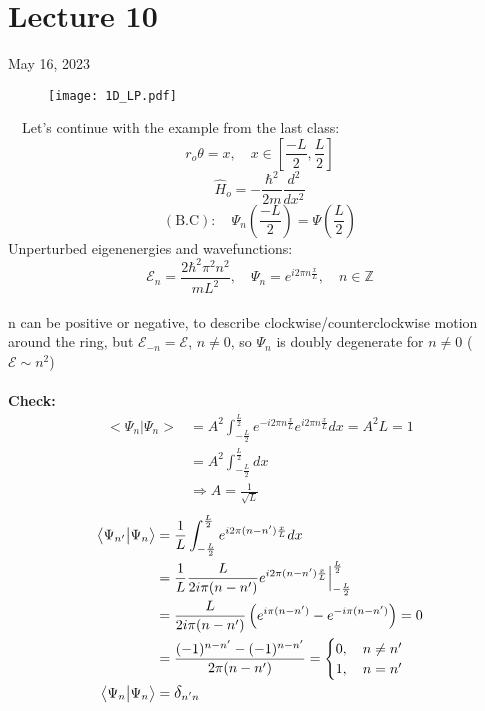 \documentclass[12pt,fancychapters]{report}
\numberwithin{equation}{section}
\begin{document}
\section{Lecture 10}
May 16, 2023\\
\begin{wrapfigure}{l}{6cm}
  \begin{center}
    \texttt{[image: 1D\_LP.pdf]}
  \end{center}
\end{wrapfigure}
\
\
Let's continue with the example from the last class: 
\[r_o \theta = x, \quad x \in \left[\frac{-L}{2}, \frac{L}{2} \right]\]
\[\hat{H}_o = -\frac{\hbar^2}{2m}\frac{d^2}{dx^2}\]
\[\left(\text{B.C}\right):\quad \Psi_n\left(\frac{-L}{2}\right) =
  \Psi\left(\frac{L}{2}\right)
\]
Unperturbed eigenenergies and wavefunctions:
\[
  \mathcal{E}_n = \frac{2\hbar^2 \pi^2 n^2}{mL^2},\quad \Psi_n = e^{i 2\pi n \frac{x}{L}},
  \quad n \in \mathbb{Z}
\]\\
n can be positive or negative, to describe clockwise/counterclockwise motion around the ring, but 
$\mathcal{E}_{-n} = \mathcal{E}$, $n \neq 0$, so $\Psi_n$ is doubly degenerate for 
$n\neq 0$ ($\mathcal{E}\sim n^2$)\\
\\
\textbf{Check:}
\begin{align*}
  \big<\Psi_n\big|\Psi_n\big> &= A^2 \int_{-\frac{L}{2}}^{\frac{L}{2}} e^{-i2\pi n \frac{x}{L}}
  e^{i2\pi n \frac{x}{L}}dx = A^2 L = 1\\
 &= A^2\int_{-\frac{L}{2}}^{\frac{L}{2}} dx \\
 &\Rightarrow \boxed{A = \frac{1}{\sqrt{L}}}
\end{align*}
\begin{align*}
  \big<\Psi_{n'}\big|\Psi_n\big> &= \frac{1}{L}
   \int_{-\frac{L}{2}}^{\frac{L}{2}} e^{i2\pi(n-n') \frac{x}{L}}dx\\
  &= \frac{1}{L}\frac{L}{2i\pi (n-n') }e^{i2\pi(n-n') \frac{x}{L}}\Big|_{-\frac{L}{2}}^{\frac{L}{2}}\\
  &=\frac{L}{2i\pi (n-n') } \left(e^{i\pi(n-n')} -e^{-i\pi(n-n')}  \right)=0\\
  &= \frac{(-1)^{n-n'} - (-1)^{n-n'}}{2\pi(n-n')} = \begin{cases} 0,\quad n\neq n'\\ 
    1, \quad n = n'\\
  \end{cases}\\
  \big<\Psi_n\big|\Psi_n\big> &= \mathlarger{\delta}_{n'n}
\end{align*}
\end{document}
